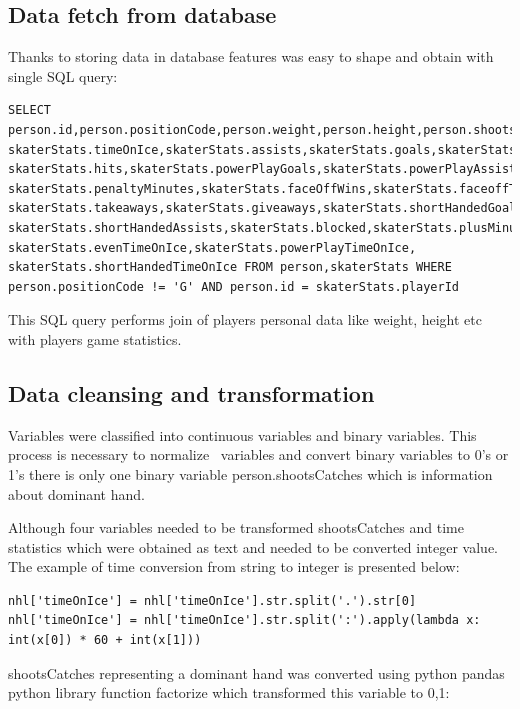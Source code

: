 		\subsection{Data fetch from database}
			Thanks to storing data in database features was easy to shape and obtain with single SQL query:
\begin{verbatim}
SELECT person.id,person.positionCode,person.weight,person.height,person.shootsCatches,
skaterStats.timeOnIce,skaterStats.assists,skaterStats.goals,skaterStats.shots,
skaterStats.hits,skaterStats.powerPlayGoals,skaterStats.powerPlayAssists,
skaterStats.penaltyMinutes,skaterStats.faceOffWins,skaterStats.faceoffTaken,
skaterStats.takeaways,skaterStats.giveaways,skaterStats.shortHandedGoals,
skaterStats.shortHandedAssists,skaterStats.blocked,skaterStats.plusMinus,
skaterStats.evenTimeOnIce,skaterStats.powerPlayTimeOnIce,
skaterStats.shortHandedTimeOnIce FROM person,skaterStats WHERE person.positionCode != 'G' AND person.id = skaterStats.playerId
\end{verbatim}
			This SQL query performs join of players personal data like weight, height etc with players game statistics.
		
		\subsection{Data cleansing and transformation}
			Variables were classified into continuous variables and binary variables. This process is necessary to normalize \
			variables and convert binary variables to 0's or 1's there is only one binary variable person.shootsCatches which is information about dominant hand.
			
			Although four variables needed to be transformed shootsCatches and time statistics which were obtained as text and needed to be converted integer value. The example of time conversion from string to integer is presented below:
			
\begin{verbatim}
nhl['timeOnIce'] = nhl['timeOnIce'].str.split('.').str[0]
nhl['timeOnIce'] = nhl['timeOnIce'].str.split(':').apply(lambda x: int(x[0]) * 60 + int(x[1]))
\end{verbatim}
			
			shootsCatches representing a dominant hand was converted using python pandas python library function factorize which transformed this variable to {0,1}:
			
